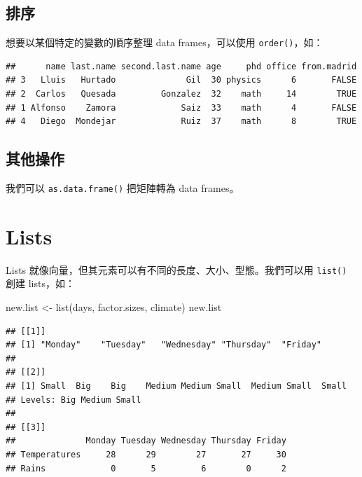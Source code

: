 \documentclass[
]{book}
\newenvironment{Shaded}{\begin{snugshade}}{\end{snugshade}}
\newcommand{\FunctionTok}[1]{\textcolor[rgb]{0.00,0.00,0.00}{#1}}
\newcommand{\NormalTok}[1]{#1}
\newcommand{\OtherTok}[1]{\textcolor[rgb]{0.56,0.35,0.01}{#1}}
\newcommand{\SpecialCharTok}[1]{\textcolor[rgb]{0.00,0.00,0.00}{#1}}
\theoremstyle{definition}
\theoremstyle{remark}
\begin{document}
\hypertarget{dataframeordering}{%
\subsection{排序}\label{dataframeordering}}

想要以某個特定的變數的順序整理 data frames，可以使用 \texttt{order()}，如：

\begin{Shaded}
\end{Shaded}

\begin{verbatim}
##      name last.name second.last.name age     phd office from.madrid
## 3   Lluis   Hurtado              Gil  30 physics      6       FALSE
## 2  Carlos   Quesada         Gonzalez  32    math     14        TRUE
## 1 Alfonso    Zamora             Saiz  33    math      4       FALSE
## 4   Diego  Mondejar             Ruiz  37    math      8        TRUE
\end{verbatim}

\hypertarget{ux5176ux4ed6ux64cdux4f5c-1}{%
\subsection{其他操作}\label{ux5176ux4ed6ux64cdux4f5c-1}}

我們可以 \texttt{as.data.frame()} 把矩陣轉為 data frames。

\hypertarget{lists}{%
\section{Lists}\label{lists}}

Lists 就像向量，但其元素可以有不同的長度、大小、型態。我們可以用 \texttt{list()} 創建 lists，如：

\begin{Shaded}
\begin{Highlighting}[]
\NormalTok{new.list }\OtherTok{\textless{}{-}} \FunctionTok{list}\NormalTok{(days, factor.sizes, climate)}
\NormalTok{new.list}
\end{Highlighting}
\end{Shaded}

\begin{verbatim}
## [[1]]
## [1] "Monday"    "Tuesday"   "Wednesday" "Thursday"  "Friday"   
## 
## [[2]]
## [1] Small  Big    Big    Medium Medium Small  Medium Small  Small 
## Levels: Big Medium Small
## 
## [[3]]
##              Monday Tuesday Wednesday Thursday Friday
## Temperatures     28      29        27       27     30
## Rains             0       5         6        0      2
\end{verbatim}
\end{document}
